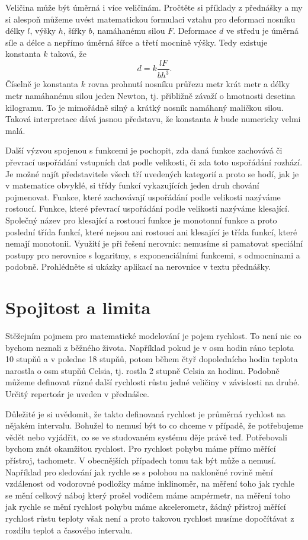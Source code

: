 \documentclass[12pt]{article}
\begin{document}
Veličina může být úměrná i více veličinám. Pročtěte si příklady z přednášky a my si alespoň můžeme uvést matematickou formulaci vztahu pro deformaci nosníku délky $l$, výšky $h$, šířky $b$, namáhanému silou $F$. Deformace $d$ ve středu je úměrná síle a délce a nepřímo úměrná šířce a třetí mocnině výšky. Tedy existuje konstanta $k$ taková, že $$d=k\frac {l F}{b h^3}.$$ Číselně je konstanta $k$ rovna prohnutí nosníku průřezu metr krát metr a délky metr namáhanému silou jeden Newton, tj. přibližně závaží o hmotnosti desetina kilogramu. To je mimořádně silný a krátký nosník namáhaný maličkou silou. Taková interpretace dává jasnou představu, že konstanta $k$ bude numericky velmi malá.

Další výzvou spojenou s funkcemi je pochopit, zda daná funkce zachovává či převrací uspořádání vstupních dat podle velikosti, či zda toto uspořádání rozhází. Je možné najít představitele všech tří uvedených kategorií a proto se hodí, jak je v matematice obvyklé, si třídy funkcí vykazujících jeden druh chování pojmenovat. Funkce, které zachovávají uspořádání podle velikosti nazýváme rostoucí. Funkce, které převrací uspořádání podle velikosti nazýváme klesající. Společný název pro klesající a rostoucí funkce je monotonní funkce a proto poslední třída funkcí, které nejsou ani rostoucí ani klesající je třída funkcí, které nemají monotonii. Využití je při řešení nerovnic: nemusíme si pamatovat speciální postupy pro nerovnice s logaritmy, s exponenciálními funkcemi, s odmocninami a podobně. Prohlédněte si ukázky aplikací na nerovnice v textu přednášky.

\newpage
\section*{Spojitost a limita}

Stěžejním pojmem pro matematické modelování je pojem rychlost. To není nic co bychom neznali z běžného života. Například pokud je v osm hodin ráno teplota 10 stupňů a v poledne 18 stupňů, potom během čtyř dopolednícho hodin teplota narostla o osm stupňů Celsia, tj. rostla 2 stupně Celsia za hodinu. Podobně můžeme definovat různé další rychlosti růstu jedné veličiny v závislosti na druhé. Určitý repertoár je uveden v přednášce.

Důležité je si uvědomit, že takto definovaná rychlost je průměrná rychlost na nějakém intervalu. Bohužel to nemusí být to co chceme v případě, že potřebujeme vědět nebo vyjádřit, co se ve studovaném systému děje právě teď. Potřebovali bychom znát okamžitou rychlost. Pro rychlost pohybu máme přímo měřící přístroj, tachometr. V obecnějších případech tomu tak být může a nemusí. Například pro sledování jak rychle se s polohou na nakloněné rovině mění vzdálenost od vodorovné podložky máme inklinoměr, na měření toho jak rychle se mění celkový náboj který prošel vodičem máme ampérmetr, na měření toho jak rychle se mění rychlost pohybu máme akcelerometr, žádný přístroj měřící rychlost růstu teploty však není a proto takovou rychlost musíme dopočítávat z rozdílu teplot a časového intervalu.
\end{document}
